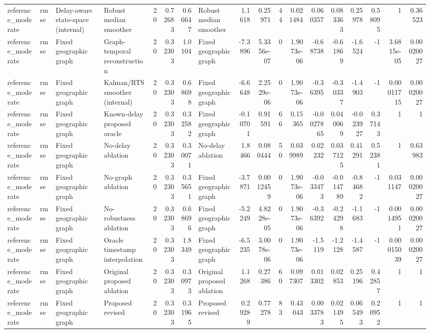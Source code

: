 \begin{table}[!htbp]
{\begin{tabular}{llllrrrlrrrrrrrrrr}
reference_moderate & rmse & Delay-aware state-space (internal) & Robust median smoother & 20 & 0.72683 & 0.66647 & Robust median smoother & 1.1618 & 0.25971 & 44 & 0.021484 & 0.060357 & 0.083363 & 0.25978 & 0.58095 & 1 & 0.36523 \\
reference_moderate & rmse & Fixed geographic graph & Graph-temporal reconstruction & 20 & 0.32303 & 1.0104 & Fixed geographic graph & -7.3896 & 5.3356e-07 & 0 & 1.9073e-06 & -0.68738 & -0.61869 & -1.6524 & -1 & 3.6815e-05 & 0.00020027 \\
reference_moderate & rmse & Fixed geographic graph & Kalman/RTS smoother (internal) & 20 & 0.32303 & 0.68698 & Fixed geographic graph & -6.6648 & 2.2529e-06 & 0 & 1.9073e-06 & -0.36395 & -0.30337 & -1.4903 & -1 & 0.00011715 & 0.00020027 \\
reference_moderate & rmse & Fixed geographic graph & Known-delay proposed oracle & 20 & 0.32303 & 0.32582 & Fixed geographic graph & -0.10701 & 0.91591 & 66 & 0.15365 & -0.0027865 & 0.040069 & -0.023927 & 0.37143 & 1 & 1 \\
reference_moderate & rmse & Fixed geographic graph & No-delay ablation & 20 & 0.32303 & 0.30071 & No-delay ablation & 1.8466 & 0.080444 & 50 & 0.039989 & 0.02232 & 0.037125 & 0.41291 & 0.52381 & 1 & 0.63983 \\
reference_moderate & rmse & Fixed geographic graph & No-graph ablation & 20 & 0.32303 & 0.35651 & Fixed geographic graph & -3.7871 & 0.0012459 & 0 & 1.9073e-06 & -0.033473 & -0.014789 & -0.84682 & -1 & 0.031147 & 0.00020027 \\
reference_moderate & rmse & Fixed geographic graph & No-robustness ablation & 20 & 0.32303 & 0.68696 & Fixed geographic graph & -5.2249 & 4.8228e-05 & 0 & 1.9073e-06 & -0.36392 & -0.24298 & -1.1683 & -1 & 0.0014951 & 0.00020027 \\
reference_moderate & rmse & Fixed geographic graph & Oracle timestamp interpolation & 20 & 0.32303 & 1.8349 & Fixed geographic graph & -6.5235 & 3.0078e-06 & 0 & 1.9073e-06 & -1.5119 & -1.2128 & -1.4587 & -1 & 0.00015039 & 0.00020027 \\
reference_moderate & rmse & Fixed geographic graph & Original proposed ablation & 20 & 0.32303 & 0.30973 & Original proposed ablation & 1.1268 & 0.27386 & 60 & 0.097307 & 0.013302 & 0.02853 & 0.25196 & 0.42857 & 1 & 1 \\
reference_moderate & rmse & Fixed geographic graph & Proposed revised & 20 & 0.32303 & 0.31965 & Proposed revised & 0.29289 & 0.77278 & 83 & 0.43043 & 0.0033783 & 0.021495 & 0.065493 & 0.20952 & 1 & 1 \\

\end{tabular}}
\end{table}
